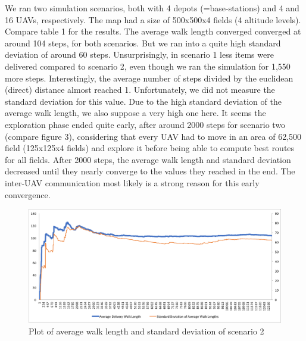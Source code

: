 We ran two simulation scenarios, both with 4 depots (=base-stations) and 4 and 16 UAVs, respectively. The map had a size of 500x500x4 fields (4 altitude levels). Compare table 1 for the results. The average walk length converged converged at around 104 steps, for both scenarios. But we ran into a quite high standard deviation of around 60 steps. Unsurprisingly, in scenario 1 less items were delivered compared to scenario 2, even though we ran the simulation for 1,550 more steps. Interestingly, the average number of steps divided by the euclidean (direct) distance almost reached 1. Unfortunately, we did not measure the standard deviation for this value. Due to the high standard deviation of the average walk length, we also suppose a very high one here. It seems the exploration phase ended quite early, after around 2000 steps for scenario two (compare figure 3), considering that every UAV had to move in an area of 62,500 field (125x125x4 fields) and explore it before being able to compute best routes for all fields. After 2000 steps, the average walk length and standard deviation decreased until they nearly converge to the values they reached in the end. The inter-UAV communication most likely is a strong reason for this early convergence. \\
 
 \begin{figure}\label{fig:eval}
 \centering
 \includegraphics[width=\textwidth]{images/graph}
 \caption{Plot of average walk length and standard deviation of scenario 2}
 \end{figure}

